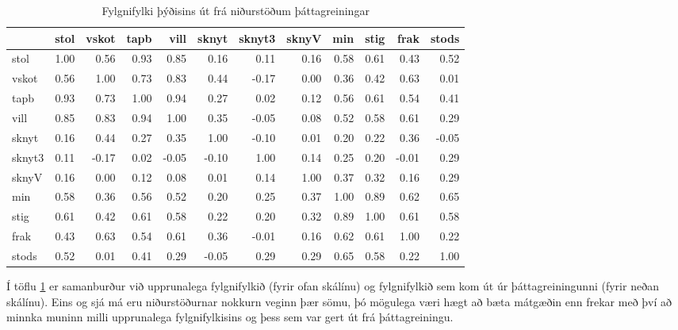 \documentclass[]{book}
\begin{document}
\begin{table}

\caption{\label{tab:popcorrmatrix}Fylgnifylki þýðisins út frá niðurstöðum þáttagreiningar}
\centering
\begin{tabular}[t]{l|r|r|r|r|r|r|r|r|r|r|r}
\hline
  & stol & vskot & tapb & vill & sknyt & sknyt3 & sknyV & min & stig & frak & stods\\
\hline
stol & 1.00 & 0.56 & 0.93 & 0.85 & 0.16 & 0.11 & 0.16 & 0.58 & 0.61 & 0.43 & 0.52\\
\hline
vskot & 0.56 & 1.00 & 0.73 & 0.83 & 0.44 & -0.17 & 0.00 & 0.36 & 0.42 & 0.63 & 0.01\\
\hline
tapb & 0.93 & 0.73 & 1.00 & 0.94 & 0.27 & 0.02 & 0.12 & 0.56 & 0.61 & 0.54 & 0.41\\
\hline
vill & 0.85 & 0.83 & 0.94 & 1.00 & 0.35 & -0.05 & 0.08 & 0.52 & 0.58 & 0.61 & 0.29\\
\hline
sknyt & 0.16 & 0.44 & 0.27 & 0.35 & 1.00 & -0.10 & 0.01 & 0.20 & 0.22 & 0.36 & -0.05\\
\hline
sknyt3 & 0.11 & -0.17 & 0.02 & -0.05 & -0.10 & 1.00 & 0.14 & 0.25 & 0.20 & -0.01 & 0.29\\
\hline
sknyV & 0.16 & 0.00 & 0.12 & 0.08 & 0.01 & 0.14 & 1.00 & 0.37 & 0.32 & 0.16 & 0.29\\
\hline
min & 0.58 & 0.36 & 0.56 & 0.52 & 0.20 & 0.25 & 0.37 & 1.00 & 0.89 & 0.62 & 0.65\\
\hline
stig & 0.61 & 0.42 & 0.61 & 0.58 & 0.22 & 0.20 & 0.32 & 0.89 & 1.00 & 0.61 & 0.58\\
\hline
frak & 0.43 & 0.63 & 0.54 & 0.61 & 0.36 & -0.01 & 0.16 & 0.62 & 0.61 & 1.00 & 0.22\\
\hline
stods & 0.52 & 0.01 & 0.41 & 0.29 & -0.05 & 0.29 & 0.29 & 0.65 & 0.58 & 0.22 & 1.00\\
\hline
\end{tabular}
\end{table}

Í töflu \ref{tab:popcorrmatrix} er samanburður við upprunalega fylgnifylkið (fyrir ofan skálínu) og fylgnifylkið sem kom út úr þáttagreiningunni (fyrir neðan skálínu). Eins og sjá má eru niðurstöðurnar nokkurn veginn þær sömu, þó mögulega væri hægt að bæta mátgæðin enn frekar með því að minnka muninn milli upprunalega fylgnifylkisins og þess sem var gert út frá þáttagreiningu.
\end{document}
